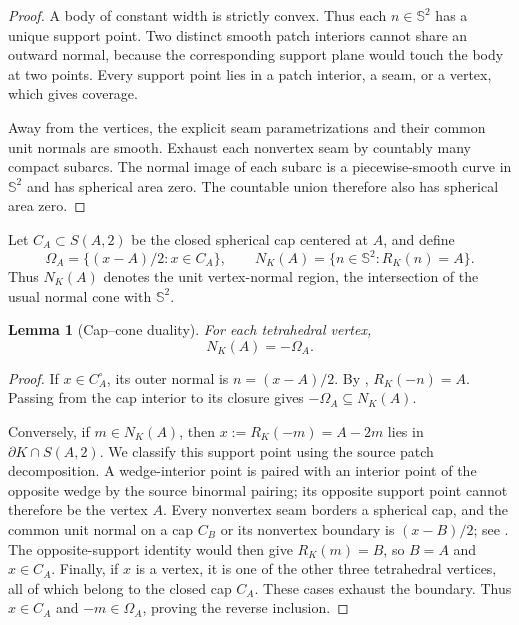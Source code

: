 \documentclass[11pt]{article}
\numberwithin{equation}{section}
\newtheorem{lemma}[theorem]{Lemma}
\theoremstyle{remark}
\newcommand{\Sph}{\mathbb{S}^{2}}
\begin{document}
\begin{proof}
A body of constant width is strictly convex.  Thus each \(n\in\Sph\) has a unique support point.  Two distinct smooth patch interiors cannot share an outward normal, because the corresponding support plane would touch the body at two points.  Every support point lies in a patch interior, a seam, or a vertex, which gives coverage.

Away from the vertices, the explicit seam parametrizations and their common unit normals are smooth. Exhaust each nonvertex seam by countably many compact subarcs. The normal image of each subarc is a piecewise-smooth curve in \(\Sph\) and has spherical area zero. The countable union therefore also has spherical area zero.
\end{proof}

Let \(C_A\subset S(A,2)\) be the closed spherical cap centered at \(A\), and define
\[
  \Omega_A=\{(x-A)/2:x\in C_A\},\qquad
  N_K(A)=\{n\in\Sph:R_K(n)=A\}.
\]
Thus \(N_K(A)\) denotes the unit vertex-normal region, the intersection of the usual normal cone with \(\Sph\).

\begin{lemma}[Cap--cone duality]
\label{lem:cap-cone}
For each tetrahedral vertex,
\begin{equation}
  N_K(A)=-\Omega_A.
  \label{eq:cap-cone}
\end{equation}
\end{lemma}

\begin{proof}
If \(x\in C_A^\circ\), its outer normal is \(n=(x-A)/2\).  By , \(R_K(-n)=A\). Passing from the cap interior to its closure gives \(-\Omega_A\subseteq N_K(A)\).

Conversely, if \(m\in N_K(A)\), then
\(x:=R_K(-m)=A-2m\) lies in \(\partial K\cap S(A,2)\).
We classify this support point using the source patch decomposition.
A wedge-interior point is paired with an interior point of the opposite
wedge by the source binormal pairing; its opposite support point cannot
therefore be the vertex \(A\).  Every nonvertex seam borders a spherical
cap, and the common unit normal on a cap \(C_B\) or its nonvertex boundary
is \((x-B)/2\); see \cite[Sections~3.5 and~4, Lemma~3.8]{ArelioMontejanoOliveros2023}.
The opposite-support identity would then give \(R_K(m)=B\), so \(B=A\)
and \(x\in C_A\).  Finally, if \(x\) is a vertex, it is one of the other
three tetrahedral vertices, all of which belong to the closed cap \(C_A\).
These cases exhaust the boundary.  Thus \(x\in C_A\) and
\(-m\in\Omega_A\), proving the reverse inclusion.
\end{proof}
\end{document}
